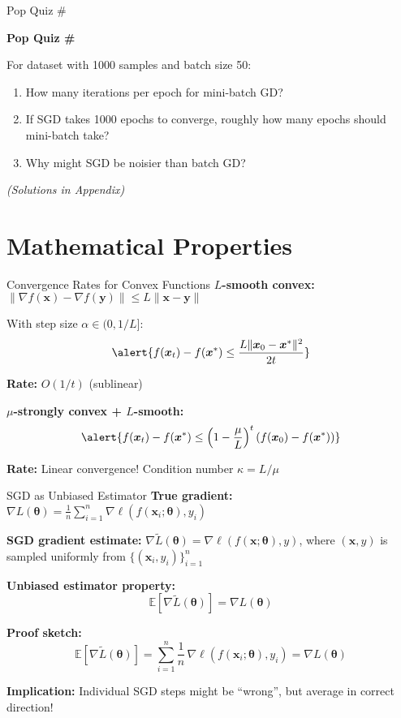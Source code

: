 \documentclass[aspectratio=169,11pt]{beamer}
\newcommand{\grad}{\nabla}
\newcommand{\vx}{\bm{x}}
\newcommand{\vtheta}{\bm{\theta}}
\newcommand{\vy}{\bm{y}}
\newcommand{\E}{\mathbb{E}}
\newcounter{popquiz}
\begin{document}
\begin{frame}{Pop Quiz \#\thepopquiz}
\begin{center}
\Large \textbf{Pop Quiz \#\thepopquiz}
\end{center}

For dataset with 1000 samples and batch size 50:
\begin{enumerate}
\item How many iterations per epoch for mini-batch GD?
\item If SGD takes 1000 epochs to converge, roughly how many epochs should mini-batch take?
\item Why might SGD be noisier than batch GD?
\end{enumerate}

\pause
\vspace{0.5cm}
\textit{(Solutions in Appendix)}
\end{frame}

\section{Mathematical Properties}

\begin{frame}{Convergence Rates for Convex Functions}
\textbf{$L$-smooth convex:} $\|\grad f(\vx) - \grad f(\vy)\| \leq L\|\vx-\vy\|$

With step size $\alpha \in (0, 1/L]$:
\[\alert{f(\vx_t) - f(\vx^*) \leq \frac{L\|\vx_0-\vx^*\|^2}{2t}}\]

\pause
\textbf{Rate:} $O(1/t)$ (sublinear)

\pause
\textbf{$\mu$-strongly convex + $L$-smooth:}
\[\alert{f(\vx_t) - f(\vx^*) \leq \left(1-\frac{\mu}{L}\right)^t (f(\vx_0) - f(\vx^*))}\]

\textbf{Rate:} Linear convergence! Condition number $\kappa = L/\mu$
\end{frame}

\begin{frame}{SGD as Unbiased Estimator}
\textbf{True gradient:} $\grad L(\vtheta) = \frac{1}{n}\sum_{i=1}^n \grad \ell(f(\vx_i;\vtheta),y_i)$

\textbf{SGD gradient estimate:} $\grad \tilde{L}(\vtheta) = \grad \ell(f(\vx;\vtheta),y)$, 
where $(\vx,y)$ is sampled uniformly from $\{(\vx_i,y_i)\}_{i=1}^n$

\pause
\textbf{Unbiased estimator property:}
\[\E[\grad \tilde{L}(\vtheta)] = \grad L(\vtheta)\]

\pause
\textbf{Proof sketch:}
\[\E[\grad \tilde{L}(\vtheta)] = \sum_{i=1}^n \frac{1}{n}\,\grad \ell(f(\vx_i;\vtheta),y_i) = \grad L(\vtheta)\]

\textbf{Implication:} Individual SGD steps might be ``wrong'', but average in correct direction!
\end{frame}
\end{document}
